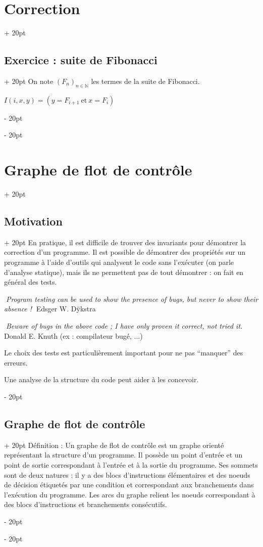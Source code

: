 \documentclass[a4paper, 12pt, twoside]{article}
\newcommand{\N}{\mathbb{N}} %
\newcommand{\simplecit}[1]{\guillemotleft$\;$#1$\;$\guillemotright}
\newcommand{\cit}[1]{\simplecit{\textcolor{656565}{#1}}}
\newcommand{\quo}[1]{\cit{\it #1}}
\newcommand{\ind}[1][20pt]{\advance\leftskip + #1}
\newcommand{\deind}[1][20pt]{\advance\leftskip - #1}
\newenvironment{indentedenv}[1][20pt]{\par \ind[#1]}{\par \deind}
\newenvironment{indt}[2][20pt]{#2 \begin{indentedenv}[#1]}{\end{indentedenv}} %
\begin{document}
\begin{indt}{\section{Correction}}
\begin{indt}{\subsection{Exercice : suite de Fibonacci}}
            On note $(F_n)_{n \in \N}$ les termes de la suite de Fibonacci.
            
            $I(i, x, y) = (y = F_{i + 1}\ \text{et}\ x = F_i)$
        \end{indt}
        
    \end{indt}
    
    \vspace{12pt}
    
    \begin{indt}{\section{Graphe de flot de contrôle}}
        
        \begin{indt}{\subsection{Motivation}}
            En pratique, il est difficile de trouver des invariants pour démontrer la correction d'un programme. Il est possible de démontrer des propriétés sur un programme à l'aide d'outils qui analysent le code sans l'exécuter (on parle d'analyse statique), mais ils ne permettent pas de tout démontrer : on fait en général des tests.
            
            \quo{Program testing can be used to show the presence of bugs, but never to show their absence !} Edsger W. Dÿkstra
            
            \quo{Beware of bugs in the above code ; I have only proven it correct, not tried it.} Donald E. Knuth
            (ex : compilateur bugé, ...)
            
            \vspace{12pt}
            
            Le choix des tests est particulièrement important pour ne pas ``manquer'' des erreurs.
            
            Une analyse de la structure du code peut aider à les concevoir.
        \end{indt}
        
        \vspace{12pt}
        
        \begin{indt}{\subsection{Graphe de flot de contrôle}}
            Définition : Un graphe de flot de contrôle est un graphe orienté représentant la structure d'un programme.
            Il possède un point d'entrée et un point de sortie correspondant à l'entrée et à la sortie du programme.
            Ses sommets sont de deux natures : il y a des blocs d'instructions élémentaires et des noeuds de décision étiquetés par une condition et correspondant aux branchements dans l'exécution du programme.
            Les arcs du graphe relient les noeuds correspondant à des blocs d'instructions et branchements consécutifs.
            

\end{indt}
\end{indt}
\end{document}
